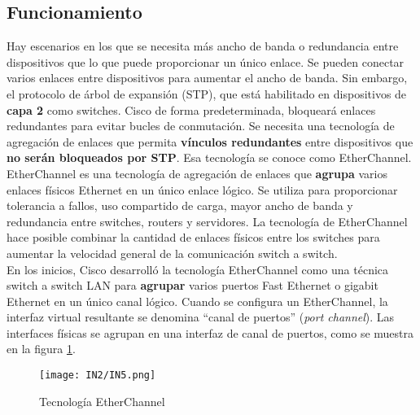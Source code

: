 \documentclass[
	12pt, %
	fleqn, %
	a4paper, %
	oneside, %
]{LegrandOrangeBook}
\begin{document}
\subsection{Funcionamiento}
Hay escenarios en los que se necesita más ancho de banda o redundancia entre  dispositivos que lo que puede proporcionar un único enlace. Se pueden conectar varios  enlaces entre dispositivos para aumentar el ancho de banda. Sin embargo, el protocolo de  árbol de expansión (STP), que está habilitado en dispositivos de \textbf{capa 2} como switches. Cisco de forma predeterminada, bloqueará enlaces redundantes para evitar bucles de  conmutación. Se necesita una tecnología de agregación de enlaces que permita \textbf{vínculos redundantes} entre dispositivos que \textbf{no serán bloqueados por STP}. Esa tecnología se conoce como EtherChannel.\\
EtherChannel es una tecnología de agregación de enlaces que \textbf{agrupa} varios enlaces físicos Ethernet en un único enlace lógico. Se utiliza para proporcionar tolerancia a fallos, uso compartido de carga, mayor ancho de banda y redundancia entre switches, routers y servidores. La tecnología de EtherChannel hace posible combinar la cantidad de enlaces físicos entre los switches para aumentar la velocidad general de la comunicación switch a switch.\\
En los inicios, Cisco desarrolló la  tecnología EtherChannel como una técnica switch a switch LAN  para \textbf{agrupar} varios puertos Fast  Ethernet o gigabit Ethernet en un  único canal lógico. Cuando se configura un EtherChannel, la interfaz virtual  resultante se denomina ``canal de  puertos'' (\textit{port channel}). Las interfaces físicas se agrupan en una interfaz de canal  de puertos, como se muestra en la figura \ref{fig:tec ether}.
\begin{figure}[H]
\centering
\texttt{[image: IN2/IN5.png]}
\caption{Tecnología EtherChannel}
\label{fig:tec ether}
\end{figure}
\end{document}
